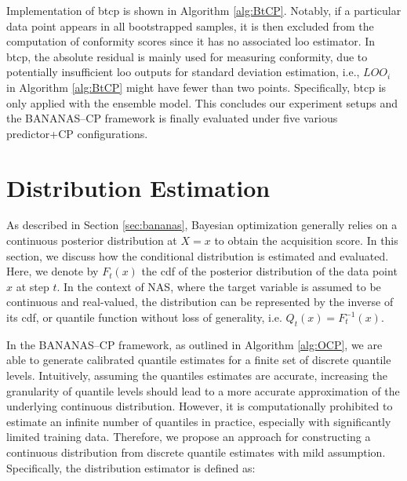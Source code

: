 Implementation of \gls{btcp} is shown in Algorithm \ref{alg:BtCP}. Notably, if a particular  data point appears in all bootstrapped samples, it is then excluded from the computation of conformity scores since it has no associated \gls{loo} estimator. In \gls{btcp}, the absolute residual is mainly used for measuring conformity, due to potentially insufficient \gls{loo} outputs for standard deviation estimation, i.e., $LOO_i$ in Algorithm \ref{alg:BtCP} might have fewer than two points. Specifically, \gls{btcp} is only applied with the ensemble model. This concludes our experiment setups and the BANANAS--CP framework is finally evaluated under five various predictor+CP configurations.


\section{Distribution Estimation}
\label{sec:distest}
As described in Section \ref{sec:bananas}, Bayesian optimization generally relies on a continuous posterior distribution at $X=x$ to obtain the acquisition score. In this section, we discuss how the conditional distribution is estimated and evaluated. Here, we denote by $F_t(x)$ the \gls{cdf} of the posterior distribution of the data point $x$ at step $t$. In the context of NAS, where the target variable is assumed to be continuous and real-valued, the distribution can be represented by the inverse of its \gls{cdf}, or quantile function without loss of generality, i.e. $Q_{t}(x) = F^{-1}_{t}(x)$. 

\vspace{0.3em}
In the BANANAS--CP framework, as outlined in Algorithm \ref{alg:OCP}, we are able to generate calibrated quantile estimates for a finite set of discrete quantile levels. Intuitively, assuming the quantiles estimates are accurate, increasing the granularity of quantile levels should lead to a more accurate approximation of the underlying continuous distribution. However, it is computationally prohibited to estimate an infinite number of quantiles in practice, especially with significantly limited training data. Therefore, we propose an approach for constructing a continuous distribution from discrete quantile estimates with mild assumption. Specifically, the distribution estimator is defined as:

